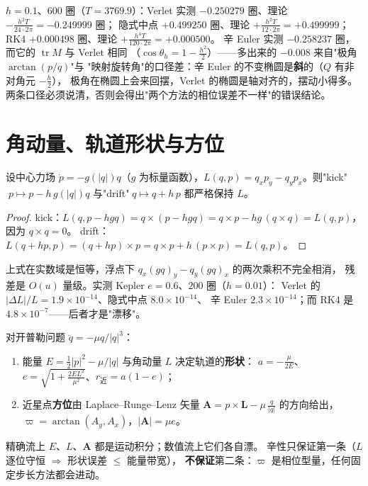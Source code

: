 \begin{remark}
$h=0.1$、$600$ 圈（$T=3769.9$）：Verlet 实测 $-0.250279$ 圈、理论 $-\tfrac{h^2T}{24\cdot2\pi}=-0.249999$ 圈；
隐式中点 $+0.499250$ 圈、理论 $+\tfrac{h^2T}{12\cdot2\pi}=+0.499999$；
RK4 $+0.000498$ 圈、理论 $+\tfrac{h^4T}{120\cdot2\pi}=+0.000500$。
辛 Euler 实测 $-0.258237$ 圈，而它的 $\operatorname{tr}M$ 与 Verlet 相同
（$\cos\theta_h=1-\tfrac{h^2}{2}$）——多出来的 $-0.008$ 来自"极角 $\arctan(p/q)$"与
"映射旋转角"的口径差：辛 Euler 的不变椭圆是\textbf{斜}的（$Q$ 有非对角元 $-\tfrac h2$），
极角在椭圆上会来回摆，Verlet 的椭圆是轴对齐的，摆动小得多。
两条口径必须说清，否则会得出"两个方法的相位误差不一样"的错误结论。
\end{remark}

\section{角动量、轨道形状与方位}
\label{sec:kepler}

\begin{theorem}
\label{thm:L}
设中心力场 $\dot p=-g(|q|)q$（$g$ 为标量函数），$L(q,p)=q_xp_y-q_yp_x$。则"kick"
$\;p\mapsto p-h\,g(|q|)q$ 与"drift"$\;q\mapsto q+h\,p$ 都严格保持 $L$。
\end{theorem}

\begin{proof}
kick：$L(q,p-hgq)=q\times(p-hgq)=q\times p-hg\,(q\times q)=L(q,p)$，因为 $q\times q=0$。
drift：$L(q+hp,p)=(q+hp)\times p=q\times p+h\,(p\times p)=L(q,p)$。
\end{proof}

\begin{remark}[浮点下的"逐位"]
上式在实数域是恒等，浮点下 $q_x(gq)_y-q_y(gq)_x$ 的两次乘积不完全相消，
残差是 $O(u)$ 量级。实测 Kepler $e=0.6$、$200$ 圈（$h=0.01$）：
Verlet 的 $|\Delta L|/L=1.9\times10^{-14}$、隐式中点 $8.0\times10^{-14}$、
辛 Euler $2.3\times10^{-14}$；而 RK4 是 $4.8\times10^{-7}$——后者才是"漂移"。
\end{remark}

\begin{theorem}[形状与方位的分离]
\label{thm:shape}
对开普勒问题 $\ddot q=-\mu q/|q|^3$：
\begin{enumerate}
  \item 能量 $E=\tfrac12|p|^2-\mu/|q|$ 与角动量 $L$ 决定轨道的\textbf{形状}：
        $a=-\tfrac{\mu}{2E}$、$e=\sqrt{1+\tfrac{2EL^2}{\mu^2}}$、$r_{\text{近}}=a(1-e)$；
  \item 近星点\textbf{方位}由 Laplace--Runge--Lenz 矢量
        $\mathbf A=p\times\mathbf L-\mu\,\tfrac{q}{|q|}$ 的方向给出，
        $\varpi=\arctan(A_y,A_x)$，$|\mathbf A|=\mu e$。
\end{enumerate}
精确流上 $E$、$L$、$\mathbf A$ 都是运动积分；数值流上它们各自漂。
辛性只保证第一条（$L$ 逐位守恒 $\Rightarrow$ 形状误差 $\le$ 能量带宽），
\textbf{不保证}第二条：$\varpi$ 是相位型量，任何固定步长方法都会进动。
\end{theorem}


